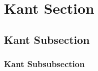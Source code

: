 \section{Kant Section}

\kant[2]

\subsection{Kant Subsection}
\kant[3]
\subsubsection{Kant Subsubsection}
\kant[3]
